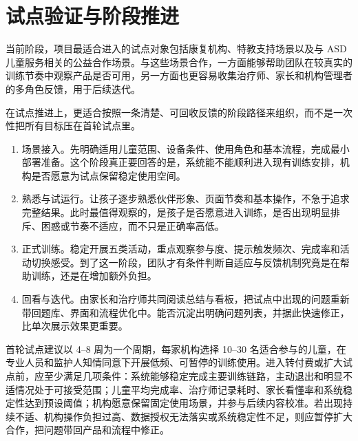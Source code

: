 \section{试点验证与阶段推进}
当前阶段，项目最适合进入的试点对象包括康复机构、特教支持场景以及与 ASD 儿童服务相关的公益合作场景。与这些场景合作，一方面能够帮助团队在较真实的训练节奏中观察产品是否可用，另一方面也更容易收集治疗师、家长和机构管理者的多角色反馈，用于后续迭代。

在试点推进上，更适合按照一条清楚、可回收反馈的阶段路径来组织，而不是一次性把所有目标压在首轮试点里。


\begin{enumerate}
  \item 场景接入。先明确适用儿童范围、设备条件、使用角色和基本流程，完成最小部署准备。这个阶段真正要回答的是，系统能不能顺利进入现有训练安排，机构是否愿意为试点保留稳定使用空间。
  \item 熟悉与试运行。让孩子逐步熟悉伙伴形象、页面节奏和基本操作，不急于追求完整结果。此时最值得观察的，是孩子是否愿意进入训练，是否出现明显排斥、困惑或节奏不适应，而不只是正确率高低。
  \item 正式训练。稳定开展五类活动，重点观察参与度、提示触发频次、完成率和活动切换感受。到了这一阶段，团队才有条件判断自适应与反馈机制究竟是在帮助训练，还是在增加额外负担。
  \item 回看与迭代。由家长和治疗师共同阅读总结与看板，把试点中出现的问题重新带回题库、界面和流程优化中。能否沉淀出明确问题列表，并据此快速修正，比单次展示效果更重要。
\end{enumerate}

首轮试点建议以 4--8 周为一个周期，每家机构选择 10--30 名适合参与的儿童，在专业人员和监护人知情同意下开展低频、可暂停的训练使用。进入转付费或扩大试点前，应至少满足几项条件：系统能够稳定完成主要训练链路，主动退出和明显不适情况处于可接受范围；儿童平均完成率、治疗师记录耗时、家长看懂率和系统稳定性达到预设阈值；机构愿意保留固定使用场景，并参与后续内容校准。若出现持续不适、机构操作负担过高、数据授权无法落实或系统稳定性不足，则应暂停扩大合作，把问题带回产品和流程中修正。

